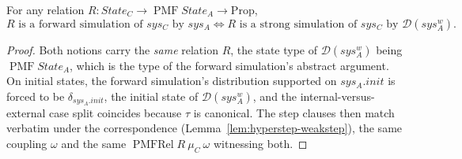 \begin{theorem}[Forward simulation $=$ strong simulation into $\mathcal{D}(\cdot^w)$]
  \label{thm:forward-equiv}
  \leanok
  For any relation $R : State_C \to \operatorname{PMF} State_A \to \mathrm{Prop}$,
  \[
    \text{$R$ is a forward simulation of $sys_C$ by $sys_A$}
    \iff
    \text{$R$ is a strong simulation of $sys_C$ by $\mathcal{D}(sys_A^w)$.}
  \]
\end{theorem}

\begin{proof}\leanok
  Both notions carry the \emph{same} relation $R$, the state type of $\mathcal{D}(sys_A^w)$ being $\operatorname{PMF} State_A$, which is the type of the forward simulation's abstract argument.
  On initial states, the forward simulation's distribution supported on $sys_A.init$ is forced to be $\delta_{sys_A.init}$, the initial state of $\mathcal{D}(sys_A^w)$, and the internal-versus-external case split coincides because $\tau$ is canonical.
  The step clauses then match verbatim under the correspondence (Lemma~\ref{lem:hyperstep-weakstep}), the same coupling $\omega$ and the same $\operatorname{PMFRel} R\ \mu_C\ \omega$ witnessing both.
\end{proof}
